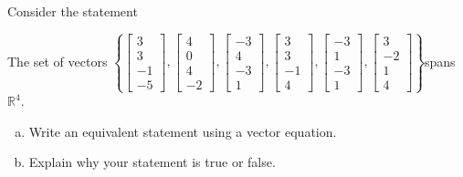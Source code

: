 
\begin{exerciseStatement}


Consider the statement 
\begin{center}\begin{minipage}{0.8\textwidth}
 The set of vectors \( \left\{ \left[\begin{array}{c}
3 \\
3 \\
-1 \\
-5
\end{array}\right] , \left[\begin{array}{c}
4 \\
0 \\
4 \\
-2
\end{array}\right] , \left[\begin{array}{c}
-3 \\
4 \\
-3 \\
1
\end{array}\right] , \left[\begin{array}{c}
3 \\
3 \\
-1 \\
4
\end{array}\right] , \left[\begin{array}{c}
-3 \\
1 \\
-3 \\
1
\end{array}\right] , \left[\begin{array}{c}
3 \\
-2 \\
1 \\
4
\end{array}\right] \right\} \)spans \(\mathbb{R}^4\). 
\end{minipage}\end{center}
    


\begin{enumerate}[(a)]
\item  Write an equivalent statement using a vector equation.
\item  Explain why your statement is true or false.
\end{enumerate}
    
\end{exerciseStatement}
    

